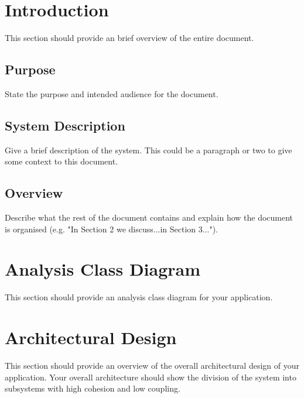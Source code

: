 \documentclass[]{article}
\begin{document}
\newpage
\section{Introduction}
\label{sec:introduction}

This section should provide an brief overview of the entire document.

\subsection{Purpose}
\label{sub:purpose}
State the purpose and intended audience for the document.

\subsection{System Description}
\label{sub:system_description}
Give a brief description of the system. This could be a paragraph or two to give some context to this document.


\subsection{Overview}
\label{sub:overview}
Describe what the rest of the document contains and explain how the document is organised (e.g. "In Section 2 we discuss...in Section 3...").



\section{Analysis Class Diagram}
\label{sec:analysis_class_diagram}
This section should provide an analysis class diagram for your application.


\section{Architectural Design}
\label{sec:architectural_design}
This section should provide an overview of the overall architectural design of your application. Your overall architecture should show the division of the system into subsystems with high cohesion and low coupling.
\end{document}
